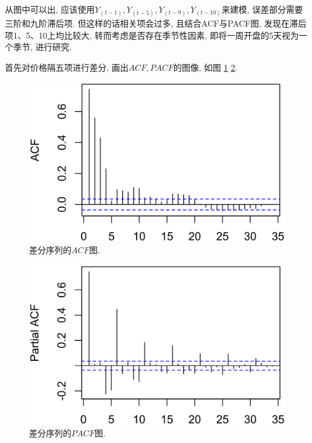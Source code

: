 \documentclass[11pt]{article}
\begin{document}
\qquad 从图中可以出, 应该使用$Y_{(t-1)},Y_{(t-5)},Y_{(t-9)},Y_{(t-10)}$来建模, 误差部分需要三阶和九阶滞后项. 但这样的话相关项会过多, 且结合ACF与PACF图, 发现在滞后项1、5、10上均比较大, 转而考虑是否存在季节性因素, 即将一周开盘的5天视为一个季节, 进行研究. 

\qquad 首先对价格隔五项进行差分, 画出$ACF, PACF$的图像, 如图 \ref{fig:acf1} \ref{fig:pacf1}.
\begin{center}
    \hspace{30pt}\begin{minipage}{0.45\textwidth}
        \begin{figure}
            \centering
            \hspace{-30pt}\includegraphics[width=.95\textwidth]{acf1}
            \caption{差分序列的$ACF$图.\label{fig:acf1}}
        \end{figure}
    \end{minipage}
    \begin{minipage}{0.45\textwidth}
        \begin{figure}
            \centering
            \hspace{-25pt}\includegraphics[width=.95\textwidth]{pacf1}
            \caption{差分序列的$PACF$图.\label{fig:pacf1}}
        \end{figure}
    \end{minipage}
\end{center}
\end{document}
